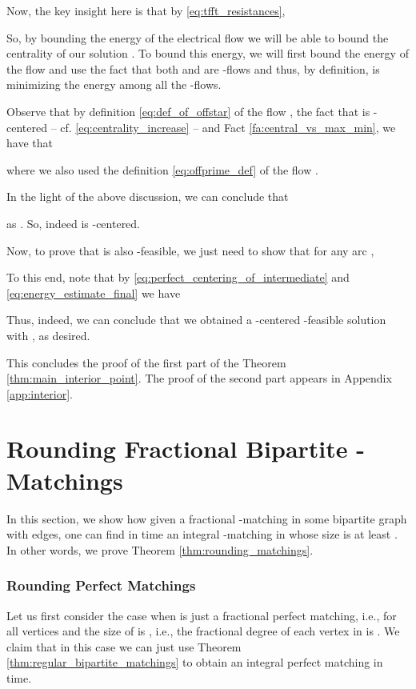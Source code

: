 \documentclass[11pt, letterpaper]{article}
\begin{document}
Now, the key insight here is that by \eqref{eq:tfft_resistances}, 

So, by bounding the energy of the electrical flow  we will be able to bound the centrality of our solution . 
To bound this energy, we will first bound the energy  of the flow  and use the fact that both  and  are -flows and thus, by definition,  is minimizing the energy among all the -flows. 

Observe that by definition \eqref{eq:def_of_offstar} of the flow , the fact that  is -centered -- cf. \eqref{eq:centrality_increase} -- and Fact \ref{fa:central_vs_max_min}, we have that

where we also used the definition \eqref{eq:offprime_def} of the flow .


In the light of the above discussion, we can conclude that 

as . So, indeed  is -centered. 

Now, to prove that  is also -feasible, we just need to show that for any arc , 

To this end, note that by \eqref{eq:perfect_centering_of_intermediate} and \eqref{eq:energy_estimate_final} we have


Thus, indeed, we can conclude that we obtained a -centered -feasible solution  with , as desired. 

This concludes the proof of the first part of the Theorem \ref{thm:main_interior_point}. The proof of the second part appears in Appendix \ref{app:interior}. 

 \section{Rounding Fractional Bipartite -Matchings}\label{sec:rounding}

In this section, we show how given a fractional -matching  in some bipartite graph  with  edges, one can find in  time an integral -matching  in  whose size is at least . In other words, we prove Theorem \ref{thm:rounding_matchings}.

\subsubsection*{Rounding Perfect Matchings}
Let us first consider the case when  is just a fractional perfect matching, i.e.,  for all vertices and the size  of  is , i.e., the fractional degree of each vertex in  is . We claim that in this case we can just use Theorem \ref{thm:regular_bipartite_matchings} to obtain an integral perfect matching in  time. 
\end{document}

